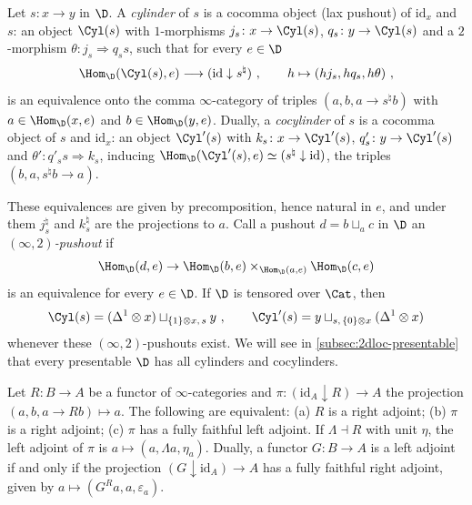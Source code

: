 \begin{defi}[cylinders]
\label{constr:cylinder}
Let $s\colon x \to y$ in $\D$. A \emph{cylinder} of $s$ is a cocomma object (lax pushout) of $\mathrm{id}_{x}$ and $s$: an object $\Cyl(s)$ with $1$-morphisms $j_{s}\colon x \to \Cyl(s)$, $q_{s}\colon y \to \Cyl(s)$ and a $2$-morphism $\theta\colon j_{s} \Rightarrow q_{s}s$, such that for every $e \in \D$
\[
\Hom_{\D}(\Cyl(s),e) \longrightarrow (\mathrm{id} \downarrow s^{\natural}) \ , \qquad h \mapsto (hj_{s},hq_{s},h\theta) \ ,
\]
is an equivalence onto the comma $\infty$-category of triples $(a,b,a \to s^{\natural}b)$ with $a \in \Hom_{\D}(x,e)$ and $b \in \Hom_{\D}(y,e)$.
Dually, a \emph{cocylinder} of $s$ is a cocomma object of $s$ and $\mathrm{id}_{x}$: an object $\Cyl'(s)$ with $k_{s}\colon x \to \Cyl'(s)$, $q'_{s}\colon y \to \Cyl'(s)$ and $\theta'\colon q'_{s}s \Rightarrow k_{s}$, inducing $\Hom_{\D}(\Cyl'(s),e) \simeq (s^{\natural} \downarrow \mathrm{id})$, the triples $(b,a,s^{\natural}b \to a)$.
\end{defi}

These equivalences are given by precomposition, hence natural in $e$, and under them $j_{s}^{\natural}$ and $k_{s}^{\natural}$ are the projections to $a$. Call a pushout $d = b \sqcup_{a} c$ in $\D$ an \emph{$(\infty,2)$-pushout} if
\[
\Hom_{\D}(d,e) \to \Hom_{\D}(b,e) \times_{\Hom_{\D}(a,e)} \Hom_{\D}(c,e)
\]
is an equivalence for every $e \in \D$. If $\D$ is tensored over $\Cat$, then
\[
\Cyl(s) = (\Delta^{1} \otimes x) \sqcup_{\{1\} \otimes x,\,s} y \ , \qquad \Cyl'(s) = y \sqcup_{s,\,\{0\} \otimes x} (\Delta^{1} \otimes x)
\]
whenever these $(\infty,2)$-pushouts exist. We will see in \cref{subsec:2dloc-presentable} that every presentable $\D$ has all cylinders and cocylinders.

\begin{lem}
\label{lem:comma-adjoint}
Let $R\colon B \to A$ be a functor of $\infty$-categories and $\pi\colon (\mathrm{id}_{A} \downarrow R) \to A$ the projection $(a,b,a \to Rb) \mapsto a$. The following are equivalent:
(a) $R$ is a right adjoint; (b) $\pi$ is a right adjoint; (c) $\pi$ has a fully faithful left adjoint.
If $\Lambda \dashv R$ with unit $\eta$, the left adjoint of $\pi$ is $a \mapsto (a,\Lambda a,\eta_{a})$.
Dually, a functor $G\colon B \to A$ is a left adjoint if and only if the projection $(G \downarrow \mathrm{id}_{A}) \to A$ has a fully faithful right adjoint, given by $a \mapsto (G^{R}a,a,\varepsilon_{a})$.
\end{lem}

